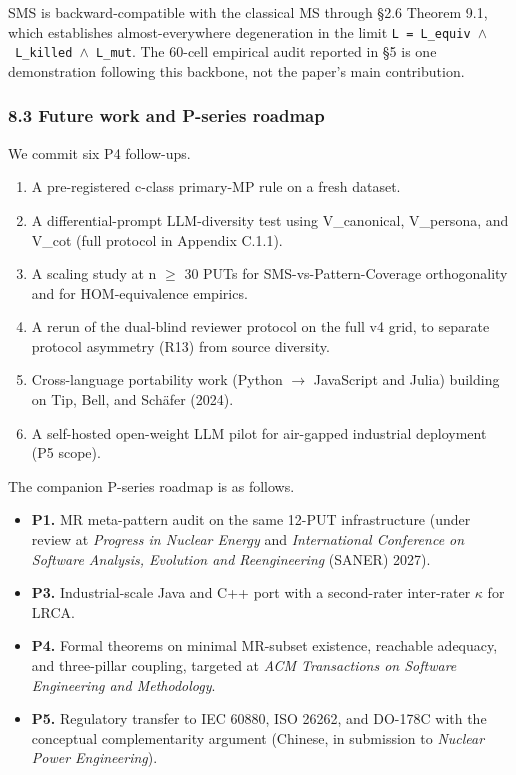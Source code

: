 \documentclass[review,12pt,authoryear]{elsarticle}
\providecommand{\tightlist}{\setlength{\itemsep}{0pt}\setlength{\parskip}{0pt}}
\begin{document}
SMS is backward-compatible with the classical MS through §2.6 Theorem
9.1, which establishes almost-everywhere degeneration in the limit
\texttt{L\ =\ L\_equiv\ $\wedge$\ L\_killed\ $\wedge$\ L\_mut}. The 60-cell empirical
audit reported in §5 is one demonstration following this backbone, not
the paper's main contribution.

\subsubsection{8.3 Future work and P-series
roadmap}\label{future-work-and-p-series-roadmap}

We commit six P4 follow-ups.

\begin{enumerate}
\def\labelenumi{(\alph{enumi})}
\item
  A pre-registered c-class primary-MP rule on a fresh dataset.
\item
  A differential-prompt LLM-diversity test using V\_canonical,
  V\_persona, and V\_cot (full protocol in Appendix C.1.1).
\item
  A scaling study at n $\geq$ 30 PUTs for SMS-vs-Pattern-Coverage
  orthogonality and for HOM-equivalence empirics.
\item
  A rerun of the dual-blind reviewer protocol on the full v4 grid, to
  separate protocol asymmetry (R13) from source diversity.
\item
  Cross-language portability work (Python $\to$ JavaScript and Julia)
  building on Tip, Bell, and Schäfer (2024).
\item
  A self-hosted open-weight LLM pilot for air-gapped industrial
  deployment (P5 scope).
\end{enumerate}

The companion P-series roadmap is as follows.

\begin{itemize}
\tightlist
\item
  \textbf{P1.} MR meta-pattern audit on the same 12-PUT infrastructure
  (under review at \emph{Progress in Nuclear Energy} and
  \emph{International Conference on Software Analysis, Evolution and
  Reengineering} (SANER) 2027).
\item
  \textbf{P3.} Industrial-scale Java and C++ port with a second-rater
  inter-rater $\kappa$ for LRCA.
\item
  \textbf{P4.} Formal theorems on minimal MR-subset existence, reachable
  adequacy, and three-pillar coupling, targeted at \emph{ACM
  Transactions on Software Engineering and Methodology}.
\item
  \textbf{P5.} Regulatory transfer to IEC 60880, ISO 26262, and DO-178C
  with the conceptual complementarity argument (Chinese, in submission
  to \emph{Nuclear Power Engineering}).
\end{itemize}
\end{document}
